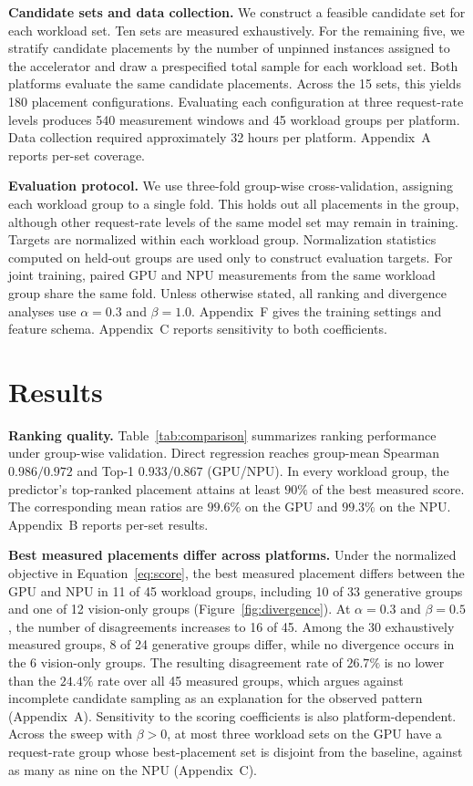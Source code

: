 \documentclass{article}
\begin{document}
\textbf{Candidate sets and data collection.} We construct a feasible candidate set for each workload set. Ten sets are measured exhaustively. For the remaining five, we stratify candidate placements by the number of unpinned instances assigned to the accelerator and draw a prespecified total sample for each workload set.
Both platforms evaluate the same candidate placements. Across the 15 sets, this yields 180 placement configurations. Evaluating each configuration at three request-rate levels produces 540 measurement windows and 45 workload groups per platform. Data collection required approximately 32 hours per platform. Appendix~A reports per-set coverage.

\textbf{Evaluation protocol.} We use three-fold group-wise cross-validation, assigning each workload group to a single fold. This holds out all placements in the group, although other request-rate levels of the same model set may remain in training. Targets are normalized within each workload group. Normalization statistics computed on held-out groups are used only to construct evaluation targets. For joint training, paired GPU and NPU measurements from the same workload group share the same fold. Unless otherwise stated, all ranking and divergence analyses use $\alpha{=}0.3$ and $\beta{=}1.0$. Appendix~F gives the training settings and feature schema. Appendix~C reports sensitivity to both coefficients.




\section{Results}
\label{sec:results}

\textbf{Ranking quality.} Table~\ref{tab:comparison} summarizes ranking performance under group-wise validation. Direct regression reaches group-mean Spearman $0.986/0.972$ and Top-1 $0.933/0.867$ (GPU/NPU). In every workload group, the predictor's top-ranked placement attains at least $90\%$ of the best measured score. The corresponding mean ratios are $99.6\%$ on the GPU and $99.3\%$ on the NPU. Appendix~B reports per-set results. 

\textbf{Best measured placements differ across platforms.} Under the normalized objective in Equation~\eqref{eq:score}, the best measured placement differs between the GPU and NPU in 11 of 45 workload groups, including 10 of 33 generative groups and one of 12 vision-only groups (Figure~\ref{fig:divergence}). At $\alpha{=}0.3$ and $\beta{=}0.5$, the number of disagreements increases to 16 of 45. Among the 30 exhaustively measured groups, 8 of 24 generative groups differ, while no divergence occurs in the 6 vision-only groups. The resulting disagreement rate of $26.7\%$ is no lower than the $24.4\%$ rate over all 45 measured groups, which argues against incomplete candidate sampling as an explanation for the observed pattern (Appendix~A). Sensitivity to the scoring coefficients is also platform-dependent. Across the sweep with $\beta{>}0$, at most three workload sets on the GPU have a request-rate group whose best-placement set is disjoint from the baseline, against as many as nine on the NPU (Appendix~C).
\end{document}
